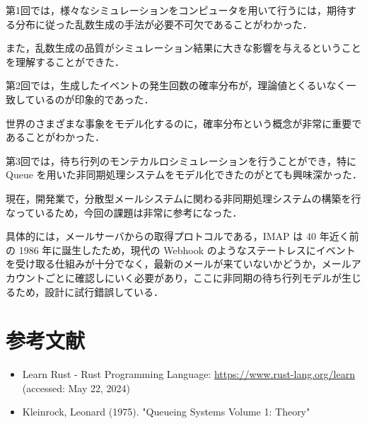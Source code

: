 \documentclass[fleqn, a4paper. 12pt]{jsarticle}
\begin{document}
    第1回では，様々なシミュレーションをコンピュータを用いて行うには，期待する分布に従った乱数生成の手法が必要不可欠であることがわかった．
    
    また，乱数生成の品質がシミュレーション結果に大きな影響を与えるということを理解することができた．

    \quad

    第2回では，生成したイベントの発生回数の確率分布が，理論値とくるいなく一致しているのが印象的であった．

    世界のさまざまな事象をモデル化するのに，確率分布という概念が非常に重要であることがわかった．

    \quad

    第3回では，待ち行列のモンテカルロシミュレーションを行うことができ，特に Queue を用いた非同期処理システムをモデル化できたのがとても興味深かった．

    現在，開発業で，分散型メールシステムに関わる非同期処理システムの構築を行なっているため，今回の課題は非常に参考になった．

    具体的には，メールサーバからの取得プロトコルである，IMAP は 40 年近く前の 1986 年に誕生したため，現代の Webhook のようなステートレスにイベントを受け取る仕組みが十分でなく，最新のメールが来ていないかどうか，メールアカウントごとに確認しにいく必要があり，ここに非同期の待ち行列モデルが生じるため，設計に試行錯誤している．

  \newpage
  
  \section*{参考文献}

    \begin{itemize}
        \item Learn Rust - Rust Programming Language: \url{https://www.rust-lang.org/learn} (accessed: May 22, 2024)
    \end{itemize}

    \begin{itemize}
      \item Kleinrock, Leonard (1975). "Queueing Systems Volume 1: Theory"
    \end{itemize}
\end{document}
